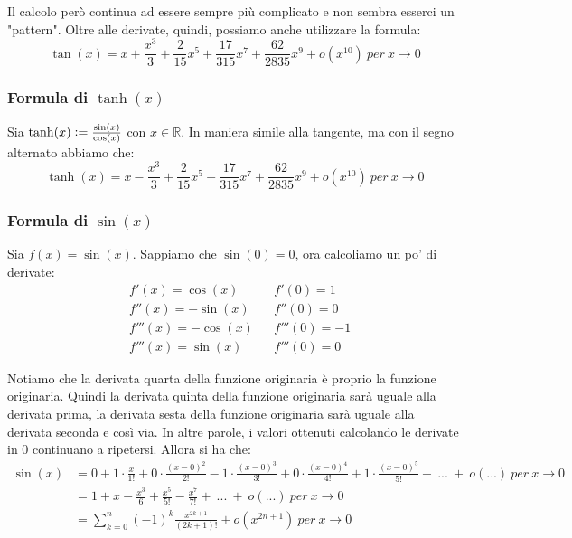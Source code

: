 \documentclass{article}
\begin{document}
\noindent Il calcolo però continua ad essere sempre più complicato e non sembra esserci un "pattern". Oltre alle derivate, quindi, possiamo anche utilizzare la formula:
\begin{equation*}
    \tan(x) = x + \frac{x^3}{3} + \frac{2}{15}x^5 + \frac{17}{315}x^7 + \frac{62}{2835}x^9 + o(x^{10}) \ per \ x \to 0
\end{equation*}

\subsubsection{Formula di $\tanh(x)$}
Sia $\tanh(x) \vcentcolon = \frac{\sin(x)}{\cos(x)}$ con $x \in \mathbb{R}$. In maniera simile alla tangente, ma con il segno alternato abbiamo che:
\begin{equation*}
    \tanh(x) = x - \frac{x^3}{3} + \frac{2}{15}x^5 - \frac{17}{315}x^7 + \frac{62}{2835}x^9 + o(x^{10}) \ per \ x \to 0
\end{equation*}

\subsubsection{Formula di $\sin(x)$}
Sia $f(x) = \sin(x)$. Sappiamo che $\sin(0) = 0$, ora calcoliamo un po' di derivate:
\begin{align*}
    & f'(x) = \cos(x) && f'(0) = 1 \\
    & f''(x) = -\sin(x) && f''(0) = 0 \\
    & f'''(x) = -\cos(x) && f'''(0) = -1 \\
    & f'''(x) = \sin(x) && f'''(0) = 0
\end{align*}

\noindent Notiamo che la derivata quarta della funzione originaria è proprio la funzione originaria. Quindi la derivata quinta della funzione originaria sarà uguale alla derivata prima, la derivata sesta della funzione originaria sarà uguale alla derivata seconda e così via. In altre parole, i valori ottenuti calcolando le derivate in $0$ continuano a ripetersi. Allora si ha che:
\begin{align*}
    \sin(x) &= 0 + 1 \cdot \frac{x}{1!} + 0 \cdot \frac{(x - 0)^2}{2!} - 1 \cdot \frac{(x - 0)^3}{3!} + 0 \cdot \frac{(x - 0)^4}{4!} + 1 \cdot \frac{(x - 0)^5}{5!} + \ ... \ + \ o(...) \ per \ x \to 0 \\
    &= 1 + x - \frac{x^3}{6} + \frac{x^5}{5!} - \frac{x^7}{7!} + \ ... \ + \ o(...) \ per \ x \to 0 \\
    &= \sum_{k = 0}^n (-1)^k \frac{x^{2k + 1}}{(2k + 1)!} + o(x^{2n + 1}) \ per \ x \to 0
\end{align*}
\end{document}
